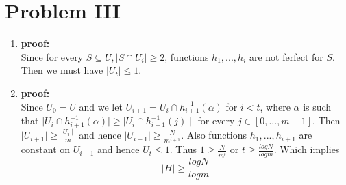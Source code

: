 \section{Problem III}
\begin{enumerate}
	\item \textbf{proof:}\\
	Since for every $S \subseteq U, \mid S \cap U_{i} \mid \geq 2$, functions $h_1, ..., h_i$ are not ferfect for $S$. Then we must have $\mid U_{t} \mid \leq 1$.
	\item \textbf{proof:}\\
	Since $U_{0} = U$ and we let $U_{i + 1} = U_{i} \cap h^{-1}_{i + 1}(\alpha)$ for $i < t$, where $\alpha$ is such that $\mid U_{i} \cap h^{-1}_{i + 1}(\alpha) \mid \geq \mid U_{i} \cap h^{-1}_{i + 1}(j) \mid$ for every $j \in [0, ..., m - 1]$. Then $\mid U_{i + 1} \mid \geq \frac{\mid U_{i} \mid}{m}$ and hence $\mid U_{i + 1} \mid \geq \frac{N}{m^{i + 1}} $. Also functions $h_1, ..., h_{i + 1}$ are constant on $U_{i + 1}$ and hence $U_t \leq 1$. Thus $1 \geq \frac{N}{m^t}$ or $t \geq \frac{logN}{logm}$. Which implies
	$$ \mid H \mid \geq \frac{logN}{logm} $$
\end{enumerate}
